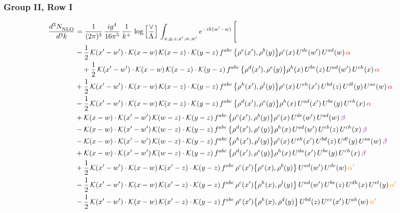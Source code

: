 \documentclass[9pt]{article}
\numberwithin{equation}{section}
\begin{document}
\subsubsection{Group II, Row I}
\begin{align}
     \frac{d^{3}N_{\rm NLO}^{\rm}}{d^{3}k}  & = \frac{1}{(2\pi)^{3}}\, \frac{ig^{4}}{16\pi^{5}}\, \frac{1}{k^{+}}\, \log{\left[\frac{\vee}{\Lambda}\right]}\, \int_{x,y,z,x^{\prime},w,w^{\prime}}e^{-ik(w^{\prime}-w)}\, \Bigg[\notag \\ & -\frac{1}{2}\,\mathcal{K}(x'-w')\cdot\mathcal{K}(x-w)\,\mathcal{K}(x-z)\cdot\mathcal{K}(y-z)\, f^{abc}\,\big\{\rho^{e}(x'),\rho^{b}(y)\big\}\rho^{c}(x)\,U^{de}(w')\,U^{ad}(w)\,{\color{red}\alpha}\notag \\ &\quad+\frac{1}{2}\,\mathcal{K}(x'-w')\cdot\mathcal{K}(x-w)\,\mathcal{K}(x-z)\cdot\mathcal{K}(y-z)\, f^{abc}\,\big\{\rho^{d}(x'),\rho^{e}(y)\big\}\rho^{h}(x)\,U^{be}(z)\,U^{ad}(w')\,U^{ch}(x)\,{\color{red}\alpha}\notag\\ & +\frac{1}{2}\,\mathcal{K}(x'-w')\cdot\mathcal{K}(x-w)\,\mathcal{K}(x-z)\cdot\mathcal{K}(y-z)\, f^{abc}\,\big\{\rho^{h}(x'),\rho^{l}(y)\big\}\rho^{c}(x)\,U^{eh}(x')\,U^{bd}(z)\,U^{dl}(y)\,U^{ae}(w)\,{\color{red}\alpha}\notag \\ &-\frac{1}{2}\,\mathcal{K}(x'-w')\cdot\mathcal{K}(x-w)\,\mathcal{K}(x-z)\cdot\mathcal{K}(y-z)\, f^{abc}\,\big\{\rho^{d}(x'),\rho^{e}(y)\big\}\rho^{h}(x)\,U^{ad}(x')\,U^{be}(y)\,U^{ch}(x)\,{\color{red}\alpha}\notag\\ &+\mathcal{K}(x-w)\cdot\mathcal{K}(x'-w')\,\mathcal{K}(w-z)\cdot\mathcal{K}(y-z)\, f^{abc}\,\big\{\rho^{e}(x'),\rho^{b}(y)\big\}\rho^{c}(x)\,U^{de}(w')\,U^{ad}(w)\,{\color{violet}\beta}\notag\\ &-\mathcal{K}(x-w)\cdot\mathcal{K}(x'-w')\,\mathcal{K}(w-z)\cdot\mathcal{K}(y-z)\, f^{abc}\,\big\{\rho^{d}(x'),\rho^{e}(y)\big\}\rho^{h}(x)\,U^{ad}(w')\,U^{eb}(z)\,U^{ch}(x)\,{\color{violet}\beta}\notag \\ &-\mathcal{K}(x-w)\cdot\mathcal{K}(x'-w')\,\mathcal{K}(w-z)\cdot\mathcal{K}(y-z)\, f^{abc}\,\big\{\rho^{h}(x'),\rho^{l}(y)\big\}\rho^{c}(x)\,U^{eh}(x')\,U^{bd}(z)\,U^{dl}(y)\,U^{ea}(w)\,{\color{violet}\beta}\notag \\ & +\mathcal{K}(x-w)\cdot\mathcal{K}(x'-w')\,\mathcal{K}(w-z)\cdot\mathcal{K}(y-z)\, f^{abc}\,\big\{\rho^{d}(x'),\rho^{e}(y)\big\}\rho^{h}(x)\,U^{da}(x')\,U^{be}(y)\,U^{ch}(x)\,{\color{violet}\beta}\notag \\ &+\frac{1}{2}\,\mathcal{K}(x'-w')\cdot\mathcal{K}(x-w)\,\mathcal{K}(x'-z)\cdot\mathcal{K}(y-z)\, f^{abc}\,\rho^{c}(x')\big\{\rho^{e}(x),\rho^{b}(y)\big\}\,U^{ad}(w')\,U^{de}(w)\,{\color{orange}\alpha'}\notag \\ &-\frac{1}{2}\,\mathcal{K}(x'-w')\cdot\mathcal{K}(x-w)\,\mathcal{K}(x'-z)\cdot\mathcal{K}(y-z)\, f^{abc}\,\rho^{c}(x')\big\{\rho^{h}(x),\rho^{l}(y)\big\}\,U^{ad}(w')\,U^{be}(z)\,U^{dh}(x)\,U^{el}(y)\,{\color{orange}\alpha'}\notag \\ &-\frac{1}{2}\,\mathcal{K}(x'-w')\cdot\mathcal{K}(x-w)\,\mathcal{K}(x'-z)\cdot\mathcal{K}(y-z)\, f^{abc}\,\rho^{e}(x')\big\{\rho^{h}(x),\rho^{d}(y)\big\}\,U^{bd}(z)\,U^{ce}(x')\,U^{ah}(w)\,{\color{orange}\alpha'}\notag \\ & 
\end{align}
\end{document}
